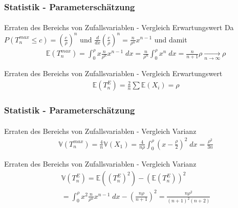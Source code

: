 \documentclass{beamer}
\begin{document}
\begin{frame}
    \frametitle{Statistik - Parameterschätzung}
\framesubtitle{}


\begin{block}{Erraten des Bereichs von Zufallsvariablen - Vergleich Erwartungswert}
Da $P( T_n^{max}  \leq c) = (\frac{c}{\rho})^n $ und  $\frac{d}{dx} (\frac{c}{\rho})^n = \frac{n}{\rho^n} x^{n-1} $ und damit
\begin{align*}
& \mathbb{E}(T_n^{max} ) = \int_{0}^{\rho} x \frac{n}{\rho^n} x^{n- 1} \; dx  = \frac{n}{\rho^n} \int_{0}^{\rho} x^n \; dx = \frac{n}{n+1} \rho    \underset{n \to \infty}{\longrightarrow} \rho
\end{align*}
\end{block}

\begin{block}{Erraten des Bereichs von Zufallsvariablen - Vergleich Erwartungswert}
\begin{align*}
& \mathbb{E}(T_n^{E} ) = \frac{2}{n} \sum \mathbb{E}(X_i)   = \rho
\end{align*}
\end{block}
 \end{frame}




\begin{frame}
    \frametitle{Statistik - Parameterschätzung}
\framesubtitle{}

\begin{block}{Erraten des Bereichs von Zufallsvariablen - Vergleich Varianz}
\begin{align*}
& \mathbb{V}(T_n^{max} ) = \frac{4}{n} \mathbb{V}(X_1)   =  \frac{4}{n \rho}   \int_{0}^{\rho } (x - \frac{\rho}{2})^2 \; dx = \frac{\rho^2}{3n}
\end{align*}
\end{block}
\begin{block}{Erraten des Bereichs von Zufallsvariablen - Vergleich Varianz}
\begin{align*}
& \mathbb{V}(T_n^{E} ) = \mathbb{E}((T_n^{E})^2 ) - (\mathbb{E}(T_n^{E} ))^2   \\
& = \int_{0}^{\rho} x^2 \frac{n}{\rho^n} x^{n- 1} \; dx - (\frac{n \rho}{n+1})^2 = \frac{n \rho^2}{(n+1)^2 (n+2)} 
\end{align*}
\end{block}
 \end{frame}
\end{document}

